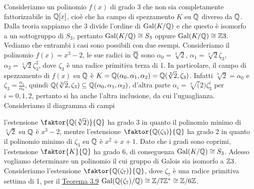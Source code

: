 \documentclass[11pt]{scrartcl}
\begin{document}
Consideriamo un polinomio $f(x)$ di grado 3 che non sia completamente fattorizzabile in $\mathbb Q[x]$, cioè che ha campo di spezzamento $K$ 
su $\mathbb Q$ diverso da $\mathbb Q$. Dalla teoria sappiamo che 3 divide l'ordine di $\operatorname{Gal}(K/\mathbb Q)$ e che questo è isomorfo a un sottogruppo di 
$S_3$, pertanto $\operatorname{Gal}(K/\mathbb Q) \cong S_3$ oppure $\operatorname{Gal}(K/\mathbb Q) \cong \mathbb Z3$. Vediamo che entrambi i casi sono possibili con due esempi.
\newline
Consideriamo il polinomio $f(x) = x^3 - 2$, le sue radici in $\overline{\mathbb Q}$ sono $\alpha_0 = \sqrt[3]{2}$, $\alpha_1 = \sqrt[3]2 \zeta_3$,
$\alpha_2 = \sqrt[3]2\zeta_3^2$, dove $\zeta_3$ è una radice primitiva terza di 1. In particolare, il campo di spezzamento di $f(x)$ su $\mathbb Q$
è $K = \mathbb Q(\alpha_0, \alpha_1, \alpha_2) = \mathbb Q(\sqrt[3]2, \zeta_3)$. Infatti $\sqrt[3]2 = \alpha_0$ e $\zeta_3 = \frac{\alpha_1}{\alpha_0}$,
quindi $\mathbb Q(\sqrt[3]2, \zeta_3) \subseteq \mathbb Q(\alpha_0, \alpha_1, \alpha_2)$, d'altra parte $\alpha_i = \sqrt[3](2)\zeta_3^i$ per 
$i = 0, 1, 2$, pertanto si ha anche l'altra inclusione, da cui l'uguaglianza. Consideriamo il diagramma di campi 
\begin{center}
\end{center}
l'estensione $\faktor{\QQ(\sqrt[3]2)}{\QQ}$ ha grado 3 in quanto il polinomio minimo di $\sqrt[3]2$ su $\mathbb Q$ è $x^3 - 2$, mentre 
l'estensione $\faktor{\QQ(\zeta_3)}{\QQ}$ ha grado 2 in quanto il polinomio minimo di $\zeta_3$ su $\mathbb Q$ è $x^2 + x + 1$. Dato 
che i gradi sono coprimi, l'estensione $\faktor{K}{\QQ}$ ha grado 6, di conseguenza $\operatorname{Gal}(K/\mathbb Q) \cong S_3$.
\newline
Adesso vogliamo determinare un polinomio il cui gruppo di Galois sia isomorfo a $\mathbb Z3$. Consideriamo l'estensione $\faktor{\QQ(\zeta_7)}{\QQ}$,
dove $\zeta_7$ è una radice primitiva settima di 1, per il \hyperref[teorema3.9]{Teorema 3.9} $\operatorname{Gal}(\mathbb Q(\zeta_7)/\mathbb Q) \cong \mathbb{Z}/{7}\mathbb{Z}^* \cong \mathbb{Z}/{6}\mathbb{Z}$.
\end{document}
